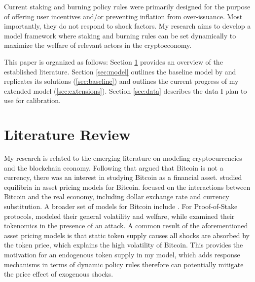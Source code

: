 \documentclass[12pt]{article}
\begin{document}
Current staking and burning policy rules were primarily designed for the purpose of offering user incentives and/or preventing inflation from over-issuance. Most importantly, they do not respond to shock factors. My research aims to develop a model framework where staking and burning rules can be set dynamically to maximize the welfare of relevant actors in the cryptoeconomy.

This paper is organized as follows: Section \ref{sec:literature} provides an overview of the established literature. Section \ref{sec:model} outlines the baseline model by \citet{biais2020equilibrium} and replicates its solutions (\ref{sec:baseline}) and outlines the current progress of my extended model (\ref{sec:extensions}). Section \ref{sec:data} describes the data I plan to use for calibration.


\section{Literature Review}
\label{sec:literature}
My research is related to the emerging literature on modeling cryptocurrencies and the blockchain economy. Following \citet{yermack2015bitcoin} that argued that Bitcoin is not a currency, there was an interest in studying Bitcoin as a financial asset. \citet{athey2016bitcoin, garratt2018bitcoin, biais2020equilibrium, pagnotta2022decentralizing} studied equilibria in asset pricing models for Bitcoin. \citet{schilling2019some, schilling2019currency} focused on the interactions between Bitcoin and the real economy, including dollar exchange rate and currency substitution. A broader set of models for Bitcoin include \citet{bolt2020value, catalini2020some, hinzen2022bitcoin, chiu2017economics, huberman2021monopoly}. For Proof-of-Stake protocols, \citet{saleh2019volatility, saleh2021blockchain} modeled their general volatility and welfare, while \citet{catalini2020markets} examined their tokenomics in the presence of an attack. A common result of the aforementioned asset pricing models is that static token supply causes all shocks are absorbed by the token price, which explains the high volatility of Bitcoin. This provides the motivation for an endogenous token supply in my model, which adds response mechanisms in terms of dynamic policy rules therefore can potentially mitigate the price effect of exogenous shocks.
\end{document}
